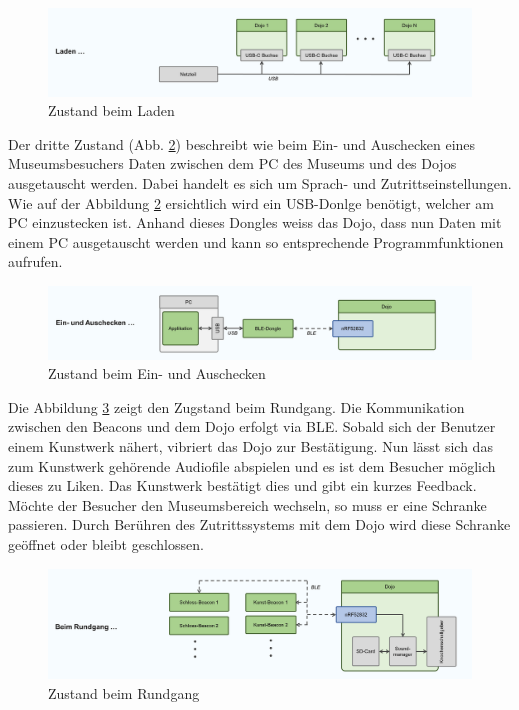 \documentclass[10pt,a4paper,oneside]{99_fhnwreport}
\begin{document}
\begin{figure}[htb]
\includegraphics[width=\textwidth]{Zustand_Laden.png}
\caption{Zustand beim Laden} %
\label{fig:image2}
\end{figure}

Der dritte Zustand (Abb. \ref{fig:image1}) beschreibt wie beim Ein- und Auschecken eines Museumsbesuchers Daten zwischen dem PC des Museums und des Dojos ausgetauscht werden. Dabei handelt es sich um Sprach- und Zutrittseinstellungen. Wie auf der Abbildung \ref{fig:image1} ersichtlich wird ein USB-Donlge benötigt, welcher am PC einzustecken ist. Anhand dieses Dongles weiss das Dojo, dass nun Daten mit einem PC ausgetauscht werden und kann so entsprechende Programmfunktionen aufrufen.

\begin{figure}[htb]
\includegraphics[width=\textwidth]{Zustand_Ein_Aus_Checken.png}
\caption{Zustand beim Ein- und Auschecken} %
\label{fig:image1}
\end{figure}

Die Abbildung \ref{fig:image4} zeigt den Zugstand beim Rundgang. Die Kommunikation zwischen den Beacons und dem Dojo erfolgt via BLE. Sobald sich der Benutzer einem Kunstwerk nähert, vibriert das Dojo zur Bestätigung. Nun lässt sich das zum Kunstwerk gehörende Audiofile abspielen und es ist dem Besucher möglich dieses zu Liken. Das Kunstwerk bestätigt dies und gibt ein kurzes Feedback. \\
Möchte der Besucher den Museumsbereich wechseln, so muss er eine Schranke passieren. Durch Berühren des Zutrittssystems mit dem Dojo wird diese Schranke geöffnet oder bleibt geschlossen.

\begin{figure}[htb]
\includegraphics[width=\textwidth]{Zustand_Rundgang.png}
\caption{Zustand beim Rundgang} %
\label{fig:image4}
\end{figure}
\end{document}
